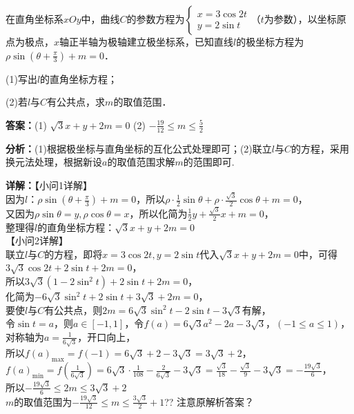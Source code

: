 \begin{question}[points=10]
[选修4-4：坐标系与参数方程]

在直角坐标系$xOy$中，曲线$C$的参数方程为$\begin{cases} x = 3\cos 2t \\ y = 2\sin t \end{cases}$（$t$为参数），以坐标原点为极点，$x$轴正半轴为极轴建立极坐标系，已知直线$l$的极坐标方程为$\rho\sin\left(\theta+\frac{\pi}{3}\right)+m=0$．

(1)写出$l$的直角坐标方程；

(2)若$l$与$C$有公共点，求$m$的取值范围．
\begin{solution}
\textbf{答案：}(1) $\sqrt{3}x+y+2m=0$
(2) $-\frac{19}{12}\leq m\leq \frac{5}{2}$

\textbf{分析：}(1)根据极坐标与直角坐标的互化公式处理即可；(2)联立$l$与$C$的方程，采用换元法处理，根据新设$a$的取值范围求解$m$的范围即可.

\textbf{详解：}【小问1详解】\\因为$l$：$\rho\sin\left(\theta+\frac{\pi}{3}\right)+m=0$，所以$\rho\cdot\frac{1}{2}\sin\theta + \rho\cdot\frac{\sqrt{3}}{2}\cos\theta + m = 0$，\\又因为$\rho\sin\theta=y, \rho\cos\theta=x$，所以化简为$\frac{1}{2}y+\frac{\sqrt{3}}{2}x+m=0$，\\整理得$l$的直角坐标方程：$\sqrt{3}x+y+2m=0$\\【小问2详解】\\联立$l$与$C$的方程，即将$x=3\cos2t, y=2\sin t$代入$\sqrt{3}x+y+2m=0$中，可得$3\sqrt{3}\cos2t+2\sin t+2m=0$，\\所以$3\sqrt{3}(1-2\sin^2t)+2\sin t+2m=0$，\\化简为$-6\sqrt{3}\sin^2t+2\sin t+3\sqrt{3}+2m=0$，\\要使$l$与$C$有公共点，则$2m=6\sqrt{3}\sin^2t-2\sin t-3\sqrt{3}$有解，\\令$\sin t=a$，则$a\in[-1,1]$，令$f(a)=6\sqrt{3}a^2-2a-3\sqrt{3}$，$(-1\leq a\leq 1)$，\\对称轴为$a=\frac{1}{6\sqrt{3}}$，开口向上，\\所以$f(a)_{\max}=f(-1)=6\sqrt{3}+2-3\sqrt{3}=3\sqrt{3}+2$，\\$f(a)_{\min}=f\left(\frac{1}{6\sqrt{3}}\right)=6\sqrt{3}\cdot\frac{1}{108}-\frac{2}{6\sqrt{3}}-3\sqrt{3}=\frac{\sqrt{3}}{18}-\frac{\sqrt{3}}{9}-3\sqrt{3}=-\frac{19\sqrt{3}}{6}$，\\所以$-\frac{19\sqrt{3}}{6}\leq 2m\leq 3\sqrt{3}+2$\\$m$的取值范围为$-\frac{19\sqrt{3}}{12}\leq m\leq \frac{3\sqrt{3}}{2}+1$?? 注意原解析答案？
\end{solution}
\end{question}

